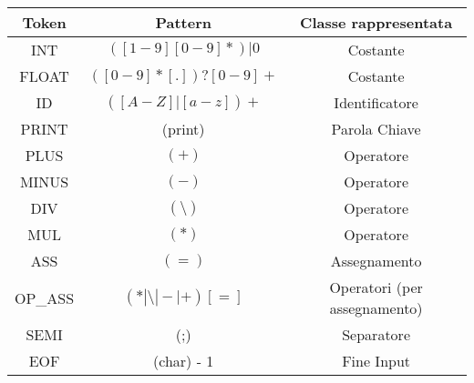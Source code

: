 \documentclass{article}
\begin{document}
\begin{center}
    \begin{tabular}{ |c|c|c| }
     \hline
     Token & Pattern & Classe rappresentata \\ 
     \hline\hline
     INT & $([1-9][0-9]*)|0$ & Costante \\ 
     FLOAT & $([0-9]*[.])?[0-9]+$ & Costante \\ 
     ID & $([A-Z]|[a-z])+$ & Identificatore \\ 
     PRINT & (print) & Parola Chiave \\ 
     PLUS & $(+)$ & Operatore \\ 
     MINUS & $(-)$ & Operatore \\
     DIV & $(\setminus)$ & Operatore \\
     MUL & $(*)$ & Operatore \\
     ASS & $(=)$ & Assegnamento \\
     OP\_ASS & $(*|\setminus|-|+)[=]$ & Operatori (per assegnamento) \\
     SEMI & (;) & Separatore \\
     EOF & (char) - 1 & Fine Input \\ 
     \hline
    \end{tabular}
\end{center}
\end{document}
